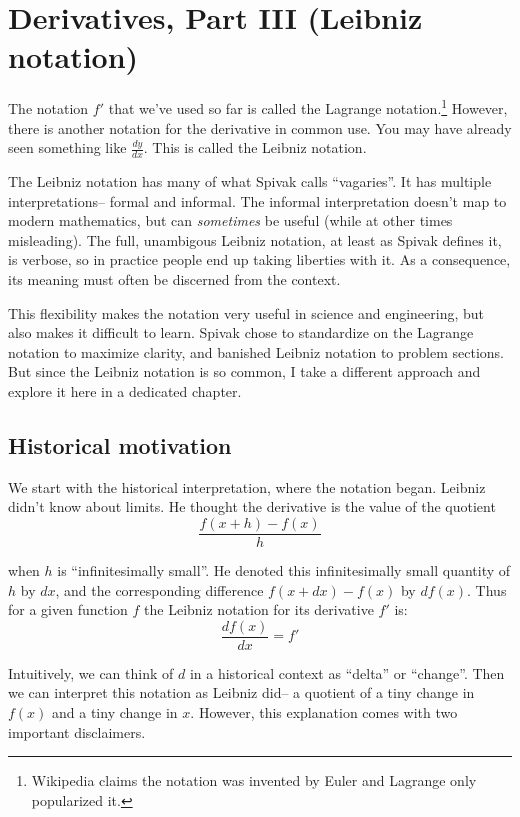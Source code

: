 
\section{Derivatives, Part III (Leibniz notation)}

The notation $f'$ that we've used so far is called the Lagrange
notation.\footnote{Wikipedia claims the notation was invented by Euler
  and Lagrange only popularized it.} However, there is another
notation for the derivative in common use. You may have already seen
something like $\frac{dy}{dx}$. This is called the Leibniz notation.

\vs

The Leibniz notation has many of what Spivak calls ``vagaries''. It
has multiple interpretations-- formal and informal. The informal
interpretation doesn't map to modern mathematics, but can
\textit{sometimes} be useful (while at other times misleading). The
full, unambigous Leibniz notation, at least as Spivak defines it, is
verbose, so in practice people end up taking liberties with it. As a
consequence, its meaning must often be discerned from the context.

\vs

This flexibility makes the notation very useful in science and
engineering, but also makes it difficult to learn. Spivak chose to
standardize on the Lagrange notation to maximize clarity, and banished
Leibniz notation to problem sections. But since the Leibniz notation
is so common, I take a different approach and explore it here in a
dedicated chapter.

\subsection{Historical motivation}

We start with the historical interpretation, where the notation began.
Leibniz didn't know about limits. He thought the derivative is the
value of the quotient
\[\frac{f(x+h)-f(x)}{h}\]

when $h$ is ``infinitesimally small''. He denoted this infinitesimally
small quantity of $h$ by $dx$, and the corresponding difference
$f(x+dx)-f(x)$ by $df(x)$. Thus for a given function $f$ the Leibniz
notation for its derivative $f'$ is:
\[\frac{df(x)}{dx}=f'\]

Intuitively, we can think of $d$ in a historical context as ``delta''
or ``change''. Then we can interpret this notation as Leibniz did-- a
quotient of a tiny change in $f(x)$ and a tiny change in $x$. However,
this explanation comes with two important disclaimers.

